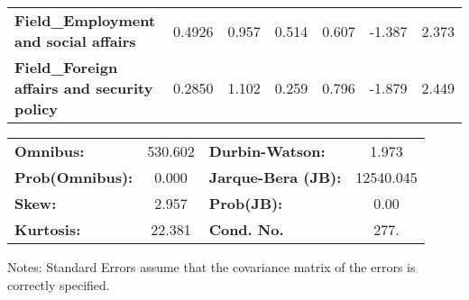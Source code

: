 \documentclass[ 11pt]{article}
\begin{document}
\begin{center}
\begin{longtable}{lcccccc}
\textbf{Field\_Employment and social affairs}              &       0.4926  &        0.957     &     0.514  &         0.607        &       -1.387    &        2.373     \\
\textbf{Field\_Foreign affairs and security policy}        &       0.2850  &        1.102     &     0.259  &         0.796        &       -1.879    &        2.449     \\
\bottomrule
\end{longtable}
\begin{tabular}{lclc}
\textbf{Omnibus:}       & 530.602 & \textbf{  Durbin-Watson:     } &     1.973  \\
\textbf{Prob(Omnibus):} &   0.000 & \textbf{  Jarque-Bera (JB):  } & 12540.045  \\
\textbf{Skew:}          &   2.957 & \textbf{  Prob(JB):          } &      0.00  \\
\textbf{Kurtosis:}      &  22.381 & \textbf{  Cond. No.          } &      277.  \\
\bottomrule
\end{tabular}
\end{center}

Notes: \newline
 [1] Standard Errors assume that the covariance matrix of the errors is correctly specified.
\end{document}
